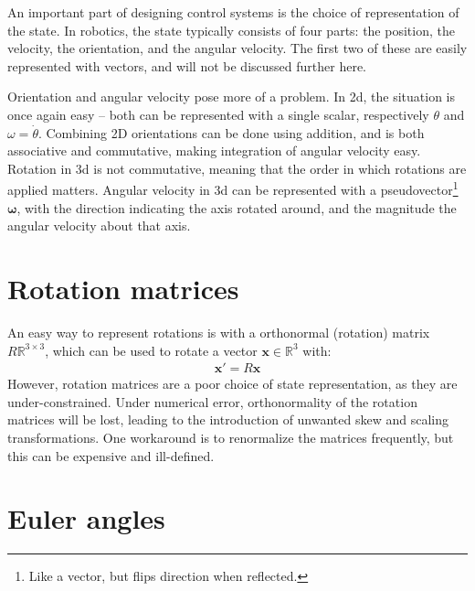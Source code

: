 \documentclass[main.tex]{subfiles}
\begin{document}
An important part of designing control systems is the choice of representation of the state. In robotics, the state typically consists of four parts: the position, the velocity, the orientation, and the angular velocity. The first two of these are easily represented with vectors, and will not be discussed further here.

Orientation and angular velocity pose more of a problem. In 2d, the situation is once again easy -- both can be represented with a single scalar, respectively $\theta$ and $\omega = \dot{\theta}$.
Combining 2D orientations can be done using addition, and is both associative and commutative, making integration of angular velocity easy.
Rotation in 3d is not commutative, meaning that the order in which rotations are applied matters.
Angular velocity in 3d can be represented with a pseudovector\footnote{Like a vector, but flips direction when reflected.} $\bm{\omega}$, with the direction indicating the axis rotated around, and the magnitude the angular velocity about that axis.

\section{Rotation matrices}

	An easy way to represent rotations is with a orthonormal (rotation) matrix $R \mathbb{R}^{3\times3}$, which can be used to rotate a vector $\bm{x} \in \mathbb{R}^{3}$ with:
	\begin{align}
		\bm{x}' = R \bm{x}
	\end{align}
	However, rotation matrices are a poor choice of state representation, as they are under-constrained.
	Under numerical error, orthonormality of the rotation matrices will be lost, leading to the introduction of unwanted skew and scaling transformations. One workaround is to renormalize the matrices frequently, but this can be expensive and ill-defined.

\section{Euler angles}
\label{app:euler-angles}
\end{document}
